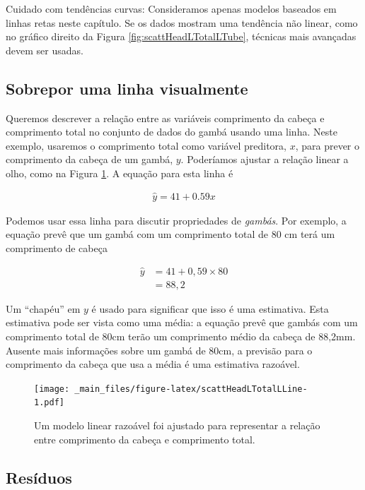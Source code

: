 \documentclass[
]{book}
\theoremstyle{definition}
\theoremstyle{definition}
\theoremstyle{definition}
\theoremstyle{definition}
\theoremstyle{remark}
\begin{document}
Cuidado com tendências curvas: Consideramos apenas modelos baseados em linhas retas neste capítulo. Se os dados mostram uma tendência não linear, como no gráfico direito da Figura \ref{fig:scattHeadLTotalLTube}, técnicas mais avançadas devem ser usadas.

\hypertarget{visuallySuperimposeLine}{%
\subsection{Sobrepor uma linha visualmente}\label{visuallySuperimposeLine}}

Queremos descrever a relação entre as variáveis comprimento da cabeça e comprimento total no conjunto de dados do gambá usando uma linha. Neste exemplo, usaremos o comprimento total como variável preditora, \(x\), para prever o comprimento da cabeça de um gambá, \(y\). Poderíamos ajustar a relação linear a olho, como na Figura \ref{fig:scattHeadLTotalLLine}. A equação para esta linha é

\begin{eqnarray}
\hat{y} = 41 + 0.59x
\label{eq:headLLinModTotalL}
\end{eqnarray}

Podemos usar essa linha para discutir propriedades de \emph{gambás}. Por exemplo, a equação prevê que um gambá com um comprimento total de 80 cm terá um comprimento de cabeça

\begin{align*}
\hat{y} &= 41 + 0,59\times 80 \\
    &= 88,2 %
\end{align*}

Um ``chapéu'' em \(y\) é usado para significar que isso é uma estimativa. Esta estimativa pode ser vista como uma média: a equação prevê que gambás com um comprimento total de 80cm terão um comprimento médio da cabeça de 88,2mm. Ausente mais informações sobre um gambá de 80cm, a previsão para o comprimento da cabeça que usa a média é uma estimativa razoável.

\begin{figure}
\centering
\texttt{[image: \_main\_files/figure-latex/scattHeadLTotalLLine-1.pdf]}
\caption{\label{fig:scattHeadLTotalLLine}Um modelo linear razoável foi ajustado para representar a relação entre comprimento da cabeça e comprimento total.}
\end{figure}

\hypertarget{residue}{%
\subsection{Resíduos}\label{residue}}
\end{document}
